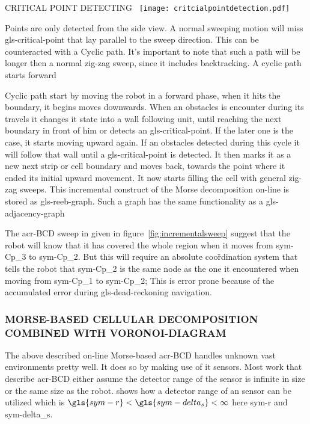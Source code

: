 \begin{RoyalFigure}[!htb, label=fig:criticalpointdetectiononline]{CRITICAL POINT DETECTING~\cite{galceran_survey_2013}}
		\texttt{[image: critcialpointdetection.pdf]}
\end{RoyalFigure}

Points are only detected from the side view. A normal sweeping motion will miss \gls{gls-critical-point} that lay
parallel to the sweep direction. This can be counteracted with a Cyclic path. It's important to note that such a path
will be longer then a normal zig-zag sweep, since it includes backtracking. A cyclic path starts forward

Cyclic path start by moving the robot in a forward phase, when it hits the boundary, it begins moves downwards. When an
obstacles is encounter during its travels it changes it state into a wall following unit, until reaching the next
boundary in front of him or detects an \gls{gls-critical-point}. If the later one is the case, it starts moving upward
again. If an obstacles detected during this cycle it will follow that wall until a \gls{gls-critical-point} is detected.
It then marks it as a new next strip or cell boundary and moves back, towards the point where it ended its initial upward
movement. It now starts filling the cell with general zig-zag sweeps. This incremental construct of the Morse
decomposition on-line is stored as \gls{gls-reeb-graph}. Such a graph has the same functionality as a
\gls{gls-adjacency-graph}

The \gls{acr-BCD} sweep in given in figure~\ref{fig:incrementalsweep} suggest that the robot will know that it has
covered the whole region when it moves from \gls{sym-Cp_3} to \gls{sym-Cp_2}. But this will require an absolute
coo\"rdination system that tells the robot that \gls{sym-Cp_2} is the same node as the one it encountered when moving
from \gls{sym-Cp_1} to \gls{sym-Cp_2}; This is error prone because of the accumulated error during
\gls{gls-dead-reckoning} navigation.

\subsubsection{MORSE-BASED CELLULAR DECOMPOSITION COMBINED WITH VORONOI-DIAGRAM}
The above described on-line Morse-based \gls{acr-BCD} handles unknown vast environments pretty well. It does so
by making use of it sensors. Most work that describe \gls{acr-BCD} either assume the detector range of the sensor is
infinite in size or the same size as the robot. \citet{acar_complete_2001} shows how a detector range of an sensor can
be utilized which is \( \gls{sym-r}  < \gls{sym-delta_s}  < \infty \) here \gls{sym-r} and
\gls{sym-delta_s}.


